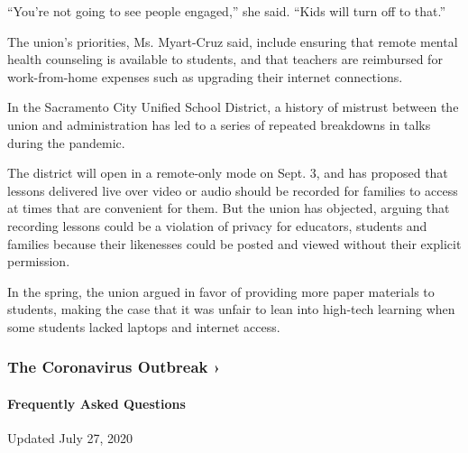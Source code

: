 ``You're not going to see people engaged,'' she said. ``Kids will turn
off to that.''

The union's priorities, Ms. Myart-Cruz said, include ensuring that
remote mental health counseling is available to students, and that
teachers are reimbursed for work-from-home expenses such as upgrading
their internet connections.

In the Sacramento City Unified School District, a history of mistrust
between the union and administration has led to a series of repeated
breakdowns in talks during the pandemic.

The district will open in a remote-only mode on Sept. 3, and has
proposed that lessons delivered live over video or audio should be
recorded for families to access at times that are convenient for them.
But the union has objected, arguing that recording lessons could be a
violation of privacy for educators, students and families because their
likenesses could be posted and viewed without their explicit permission.

In the spring, the union argued in favor of providing more paper
materials to students, making the case that it was unfair to lean into
high-tech learning when some students lacked laptops and internet
access.

\href{https://www.nytimes.com/news-event/coronavirus?action=click\&pgtype=Article\&state=default\&region=MAIN_CONTENT_3\&context=storylines_faq}{}

\hypertarget{the-coronavirus-outbreak-}{%
\subsubsection{The Coronavirus Outbreak
›}\label{the-coronavirus-outbreak-}}

\hypertarget{frequently-asked-questions}{%
\paragraph{Frequently Asked
Questions}\label{frequently-asked-questions}}

Updated July 27, 2020

